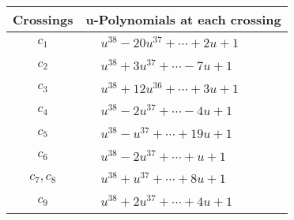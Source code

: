 \documentclass[1p]{elsarticle_modified}
\theoremstyle{definition}
\begin{document}
\begin{tabular}{m{50pt}|m{274pt}}
Crossings & \hspace{64pt}u-Polynomials at each crossing \\
\hline $$\begin{aligned}c_{1}\end{aligned}$$&$\begin{aligned}
&u^{38}-20 u^{37}+\cdots+2 u+1
\end{aligned}$\\
\hline $$\begin{aligned}c_{2}\end{aligned}$$&$\begin{aligned}
&u^{38}+3 u^{37}+\cdots-7 u+1
\end{aligned}$\\
\hline $$\begin{aligned}c_{3}\end{aligned}$$&$\begin{aligned}
&u^{38}+12 u^{36}+\cdots+3 u+1
\end{aligned}$\\
\hline $$\begin{aligned}c_{4}\end{aligned}$$&$\begin{aligned}
&u^{38}-2 u^{37}+\cdots-4 u+1
\end{aligned}$\\
\hline $$\begin{aligned}c_{5}\end{aligned}$$&$\begin{aligned}
&u^{38}- u^{37}+\cdots+19 u+1
\end{aligned}$\\
\hline $$\begin{aligned}c_{6}\end{aligned}$$&$\begin{aligned}
&u^{38}-2 u^{37}+\cdots+u+1
\end{aligned}$\\
\hline $$\begin{aligned}c_{7},c_{8}\end{aligned}$$&$\begin{aligned}
&u^{38}+u^{37}+\cdots+8 u+1
\end{aligned}$\\
\hline $$\begin{aligned}c_{9}\end{aligned}$$&$\begin{aligned}
&u^{38}+2 u^{37}+\cdots+4 u+1
\end{aligned}$\\

\end{tabular}
\end{document}
